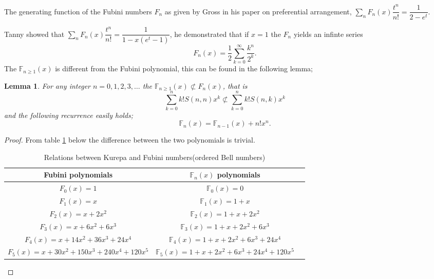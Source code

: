 \documentclass[pdflatex,sn-mathphys-num]{sn-jnl}%
\newtheorem{lemma}{Lemma}
\theoremstyle{thmstyleone}%
\theoremstyle{thmstyletwo}%
\theoremstyle{thmstylethree}%
\begin{document}
The generating function of 
 the Fubini numbers $F_n$ as given by Gross \cite{gross1962preferential} in his paper on preferential arrangement, $ \sum_n F_n(x)\dfrac{t^n}{n!}=\dfrac{1}{2-e^t}$.

Tanny \cite{tanny1975some} showed that $ \sum_n F_n(x)\dfrac{t^n}{n!}= \dfrac{1}{1-x(e^t -1)}$, he demonstrated that if $x=1$ the  $F_n$ yields an infinte series
$$F_n(x)= \dfrac{1}{2}\sum_{k=0}^{\infty}\dfrac{k^n}{2^k}. $$
The $\mathbb{F}_{n\geq1}(x)$ is different from the Fubini polynomial, this can be found in the following lemma;

\begin{lemma}\label{put}
For any integer $n=0,1,2,3,\ldots$ the $\mathbb{F}_{n\geq1}(x)\not\subset F_n(x)$, that is $$\sum_{k=0}^n k! S(n,n)x^k\not\subset \sum_{k=0}^n k! S(n,k)x^k$$ and 
the following recurrence easily holds;
$$ \mathbb{F}_{n}(x)=\mathbb{F}_{n-1}(x) +n!x^n.$$   
\end{lemma}

\begin{proof} From table \ref{table 6} below the difference between the two polynomials is trivial.
    \begin{table}[!ht]\label{6T}
    \centering
    \begin{tabular}{|c|c|c|}\hline 
        Fubini polynomials& $ \mathbb{F}_{n}(x)$ polynomials   \\\hline 
         $F_0(x) = 1$ & $\mathbb{F}_0(x) = 0$ \\\hline
        $F_1(x) = x$ & $\mathbb{F}_1(x) = 1 + x$  \\\hline
          $F_2(x) = x + 2x^2$ & $\mathbb{F}_2(x) = 1 + x + 2x^2$  \\\hline
            $F_3(x) = x + 6x^2 + 6x^3$ & $\mathbb{F}_3(x) = 1 + x + 2x^2 + 6x^3$ \\\hline
              $F_4(x) = x + 14x^2 + 36x^3 + 24x^4$ & $\mathbb{F}_4(x) = 1 + x + 2x^2 + 6x^3 + 24x^4$   \\\hline
                $F_5(x) = x + 30x^2 + 150x^3 + 240x^4 + 120x^5$ & $\mathbb{F}_5(x) = 1 + x + 2x^2 + 6x^3 + 24x^4 + 120x^5$   \\\hline
    \end{tabular}
    \caption{Relations between Kurepa and Fubini numbers(ordered Bell numbers) \cite{https://doi.org/10.1155/IJMMS.2005.3849, OEIS:A000670} }
    \label{table 6}
\end{table}

\end{proof}
\end{document}

